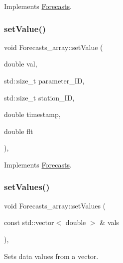 Implements \mbox{\hyperlink{class_forecasts_a4ce21957ef296384b1e251098db953bc}{Forecasts}}.

\mbox{\label{class_forecasts__array_a7224d8333630fcd162a1b69b49241d2f}} 
\subsubsection{\texorpdfstring{set\+Value()}{setValue()}\hspace{0.1cm}{\footnotesize\ttfamily [2/2]}}
{\footnotesize\ttfamily void Forecasts\+\_\+array\+::set\+Value (\begin{DoxyParamCaption}\item[{double}]{val,  }\item[{std\+::size\+\_\+t}]{parameter\+\_\+\+ID,  }\item[{std\+::size\+\_\+t}]{station\+\_\+\+ID,  }\item[{double}]{timestamp,  }\item[{double}]{flt }\end{DoxyParamCaption})\hspace{0.3cm}{\ttfamily [override]}, {\ttfamily [virtual]}}



Implements \mbox{\hyperlink{class_forecasts_a584820dc47f1b5c4cae099485ee59cbe}{Forecasts}}.

\mbox{\label{class_forecasts__array_af31e7741f2e048593cbec1c317210b65}} 
\subsubsection{\texorpdfstring{set\+Values()}{setValues()}}
{\footnotesize\ttfamily void Forecasts\+\_\+array\+::set\+Values (\begin{DoxyParamCaption}\item[{const std\+::vector$<$ double $>$ \&}]{vals }\end{DoxyParamCaption})\hspace{0.3cm}{\ttfamily [override]}, {\ttfamily [virtual]}}

Sets data values from a vector.


